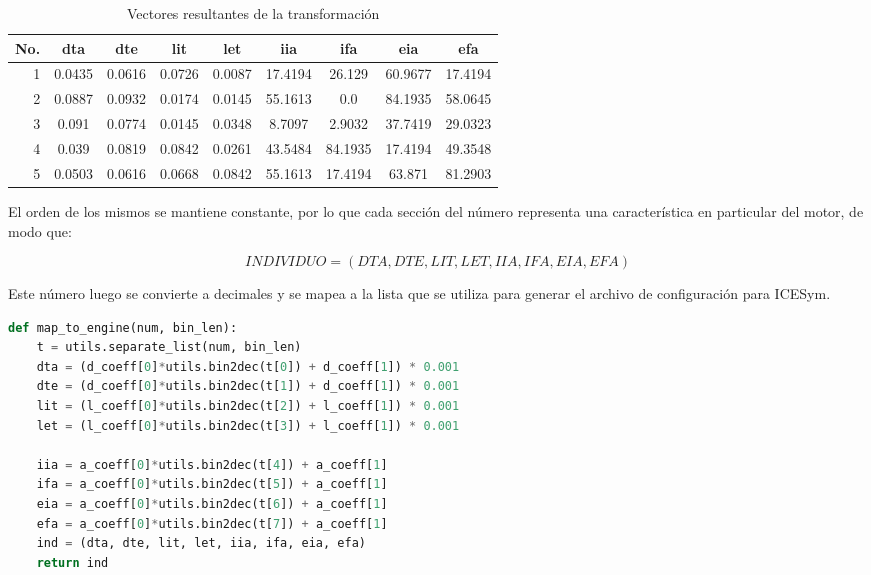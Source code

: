 \begin{table}
    \centering
        \begin{tabular}{rcccccccc} \toprule
            No. & dta    & dte    & lit    & let    & iia     & ifa     & eia     & efa     \\ \midrule
            1   & 0.0435 & 0.0616 & 0.0726 & 0.0087 & 17.4194 & 26.129  & 60.9677 & 17.4194 \\
            2   & 0.0887 & 0.0932 & 0.0174 & 0.0145 & 55.1613 & 0.0     & 84.1935 & 58.0645 \\
            3   & 0.091  & 0.0774 & 0.0145 & 0.0348 & 8.7097  & 2.9032  & 37.7419 & 29.0323 \\
            4   & 0.039  & 0.0819 & 0.0842 & 0.0261 & 43.5484 & 84.1935 & 17.4194 & 49.3548 \\
            5   & 0.0503 & 0.0616 & 0.0668 & 0.0842 & 55.1613 & 17.4194 & 63.871  & 81.2903 \\ \bottomrule
        \end{tabular}
    \caption{Vectores resultantes de la transformación}
    \label{tab:mapeo_post}
\end{table}

El orden de los mismos se mantiene constante, por lo que cada sección del número
representa una característica en particular del motor, de modo que:

\begin{equation}
    INDIVIDUO = (DTA, DTE, LIT, LET, IIA, IFA, EIA, EFA) \nonumber
\end{equation}

Este número luego se convierte a decimales y se mapea a la lista que se utiliza
para generar el archivo de configuración para ICESym.
%

\begin{lstlisting}[language=Python]
def map_to_engine(num, bin_len):
    t = utils.separate_list(num, bin_len)
    dta = (d_coeff[0]*utils.bin2dec(t[0]) + d_coeff[1]) * 0.001
    dte = (d_coeff[0]*utils.bin2dec(t[1]) + d_coeff[1]) * 0.001
    lit = (l_coeff[0]*utils.bin2dec(t[2]) + l_coeff[1]) * 0.001
    let = (l_coeff[0]*utils.bin2dec(t[3]) + l_coeff[1]) * 0.001

    iia = a_coeff[0]*utils.bin2dec(t[4]) + a_coeff[1]
    ifa = a_coeff[0]*utils.bin2dec(t[5]) + a_coeff[1]
    eia = a_coeff[0]*utils.bin2dec(t[6]) + a_coeff[1]
    efa = a_coeff[0]*utils.bin2dec(t[7]) + a_coeff[1]
    ind = (dta, dte, lit, let, iia, ifa, eia, efa)
    return ind
\end{lstlisting}


